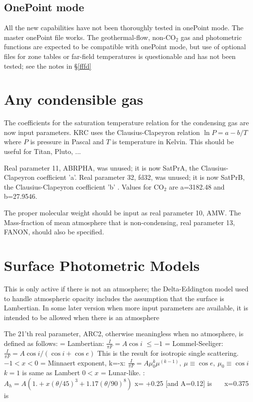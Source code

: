 \documentclass{article}
\begin{document}
\subsection{OnePoint mode}
All the new capabilities have not been thoroughly tested in onePoint mode. The
master onePoint file  works. The geothermal-flow, non-CO$_2$ gas
and photometric functions are expected to be compatible with onePoint mode, but
use of optional files for zone tables or far-field temperatures is questionable
and has not been tested; see the notes in \S \ref{fffd}

\section{Any condensible gas \label{gas}}

The coefficients for the saturation temperature relation for the condensing gas
are now input parameters. KRC uses the Clausius-Clapeyron relation $\ln P = a -
b/T$ where $P$ is pressure in Pascal and $T$ is temperature in Kelvin. This
should be useful for Titan, Pluto, ...

Real parameter 11, ABRPHA, was unused; it is now SatPrA, the Clausius-Clapeyron
coefficient 'a'. Real parameter 32, fd32, was unused; it is now SatPrB, the
Clausius-Clapeyron coefficient 'b' .  Values for CO$_2$ are a=3182.48 and
b=27.9546.

The proper molecular weight should be input as real parameter 10, AMW. The
Mass-fraction of mean atmosphere that is non-condensing, real parameter 13,
FANON, should also be specified.

\section{Surface Photometric Models \label{pm} }
This is only active if there is not an atmosphere; the Delta-Eddington model
used to handle atmospheric opacity includes the assumption that the surface is
Lambertian. In some later version when more input parameters are available, it
is intended to be allowed when there is an atmosphere

The 21'th real parameter, ARC2, otherwise meaningless when no atmosphere, is defined as follows:
 = Lambertian: $\frac{I}{\pi F} = A \cos i$ 
\qi $\leq -1$  = Lommel-Seeliger: $\frac{I}{\pi F} =A \cos i /(\cos i+ \cos e) $
\qiii This is the result for isotropic single scattering.
\qi  $-1< x< 0$ = Minnaert exponent, k=-x: $\frac{I}{\pi F}= A \mu_0^k \mu^{(k-1)}, \ \mu \equiv \cos e, \  \mu_0 \equiv \cos i $
\qiii $k=1$ is same as Lambert
\qi $ 0<x $ = Lunar-like. : $A_h= A \left( 1.+ x (\theta/45)^3+1.17(\theta/90)^8 \right)$
\qiii x= +0.25 [and A=0.12] is  \ \ \ x=0.375 is  
\end{document}
